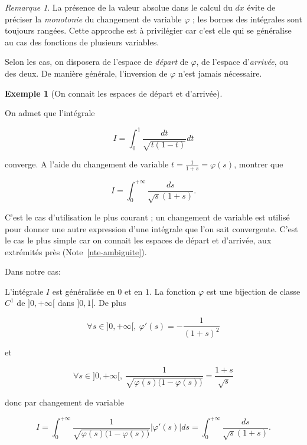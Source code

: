 \documentclass[
  french,
  letterpaper,
  DIV=11,
  numbers=noendperiod]{scrreprt}
\theoremstyle{plain}
\theoremstyle{definition}
\theoremstyle{plain}
\theoremstyle{plain}
\theoremstyle{definition}
\theoremstyle{definition}
\newtheorem{example}{Exemple}[chapter]
\theoremstyle{plain}
\theoremstyle{remark}
\newtheorem{refremark}{Remarque}[chapter]
\begin{document}
\begin{refremark}
La présence de la valeur absolue dans le calcul du \(dx\) évite de
préciser la \emph{monotonie} du changement de variable \(\varphi\) ; les
bornes des intégrales sont toujours rangées. Cette approche est à
privilégier car c'est elle qui se généralise au cas des fonctions de
plusieurs variables.

\label{rem-valeur-absolue}

\end{refremark}

Selon les cas, on disposera de l'espace de \emph{départ} de \(\varphi\),
de l'espace d'\emph{arrivée}, ou des deux. De manière générale,
l'inversion de \(\varphi\) n'est jamais nécessaire.

\begin{example}[On connait les espaces de départ et
d'arrivée]\protect\hypertarget{exm-egalite-integrales}{}\label{exm-egalite-integrales}

On admet que l'intégrale

\[
I = \int_{0}^{1}\frac{dt}{\sqrt{t(1-t)}}dt
\]

converge. A l'aide du changement de variable
\(t=\frac{1}{1+s}=\varphi(s)\), montrer que

\[
    I = \int_{0}^{+\infty}\frac{ds}{\sqrt{s}(1+s)}.
\]

C'est le cas d'utilisation le plus courant ; un changement de variable
est utilisé pour donner une autre expression d'une intégrale que l'on
sait convergente. C'est le cas le plus simple car on connait les espaces
de départ et d'arrivée, aux extrémités près (Note~\ref{nte-ambiguite}).

Dans notre cas:

L'intégrale \(I\) est généralisée en \(0\) et en \(1\). La fonction
\(\varphi\) est une bijection de classe \(C^{1}\) de \(]0,+\infty[\)
dans \(]0,1[\). De plus

\[
    \forall s \in ]0,+\infty[,\ \varphi'(s) = -\frac{1}{(1+s)^{2}}
\]

et

\[
    \forall s \in ]0,+\infty[,\ \frac{1}{\sqrt{\varphi(s)\bigr(1- \varphi(s)\bigr)}}=\frac{1+s}{\sqrt{s}}
\]

donc par changement de variable

\[
  I =\int_{0}^{+\infty} \frac{1}{\sqrt{\varphi(s)\bigr(1- \varphi(s)\bigr)}}|\varphi'(s)|ds = \int_{0}^{+\infty}\frac{ds}{\sqrt{s}(1+s)}. 
\]

\end{example}
\end{document}
